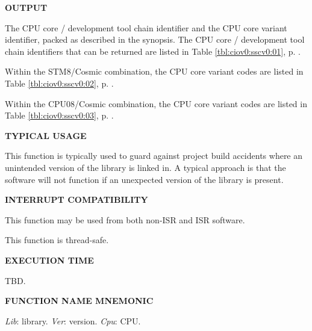 \noindent\textbf{OUTPUT}
\begin{list}{}{\setlength{\leftmargin}{0.25in}\setlength{\topsep}{0.0in}}
\item The CPU core / development tool chain identifier and the CPU core variant identifier, packed
      as described in the synopsis.  The CPU core / development tool chain identifiers
      that can be returned are listed in
      Table \ref{tbl:ciov0:sscv0:01}, p. \pageref{tbl:ciov0:sscv0:01}.

      Within the STM8/Cosmic combination, the CPU core variant codes are
      listed in 
      Table \ref{tbl:ciov0:sscv0:02}, p. \pageref{tbl:ciov0:sscv0:02}.

      Within the CPU08/Cosmic combination, the CPU core variant codes are
      listed in 
      Table \ref{tbl:ciov0:sscv0:03}, p. \pageref{tbl:ciov0:sscv0:03}.
\end{list}
\vspace{2.8ex}

\noindent\textbf{TYPICAL USAGE}
\begin{list}{}{\setlength{\leftmargin}{0.25in}\setlength{\topsep}{0.0in}}
\item This function is typically used to guard against project build accidents
      where an unintended version of the library is linked in.  A typical
      approach is that the software will not function if an unexpected version
      of the library is present.
\end{list}
\vspace{2.8ex}

\noindent\textbf{INTERRUPT COMPATIBILITY}
\begin{list}{}{\setlength{\leftmargin}{0.25in}\setlength{\topsep}{0.0in}}
\item This function may be used from both non-ISR and ISR software.
\item This function is thread-safe.
\end{list}
\vspace{2.8ex}

\noindent\textbf{EXECUTION TIME}
\begin{list}{}{\setlength{\leftmargin}{0.25in}\setlength{\topsep}{0.0in}}
\item TBD.
\end{list}
\vspace{2.8ex}

\noindent\textbf{FUNCTION NAME MNEMONIC}
\begin{list}{}{\setlength{\leftmargin}{0.25in}\setlength{\topsep}{0.0in}}
\item \emph{Lib}: library.  \emph{Ver}: version.  \emph{Cpu}: CPU.
\end{list}


